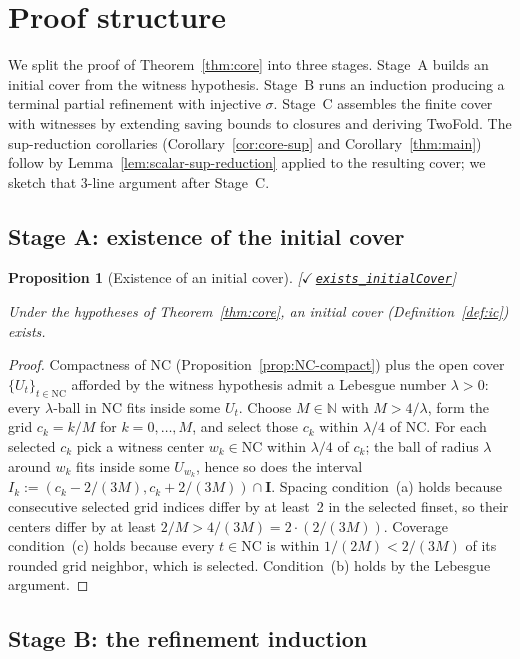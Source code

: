 \documentclass[11pt,reqno]{amsart}
\newtheorem{proposition}[theorem]{Proposition}
\theoremstyle{definition}
\newcommand{\unit}{\mathbf{I}}
\newcommand{\NC}{\mathrm{NC}}
\newcommand{\leanrepo}{https://github.com/MathNetwork/comb_arg/blob/v0.1.0/CombArg}
\newcommand{\leanmargin}[2]{%
  \nopagebreak\hfill{\normalfont\small\color{leangreen}%
    [\ensuremath{\checkmark}\,\href{\leanrepo/#2}{\texttt{#1}}]}\par\nopagebreak
}
\begin{document}
\section{Proof structure}
\label{sec:proof}

We split the proof of Theorem~\ref{thm:core} into three stages.
Stage~A builds an initial cover from the witness hypothesis.
Stage~B runs an induction producing a terminal partial
refinement with injective $\sigma$. Stage~C assembles the finite
cover with witnesses by extending saving bounds to closures and
deriving TwoFold. The sup-reduction corollaries
(Corollary~\ref{cor:core-sup} and Corollary~\ref{thm:main})
follow by Lemma~\ref{lem:scalar-sup-reduction} applied to the
resulting cover; we sketch that 3-line argument after Stage~C.

\subsection{Stage A: existence of the initial cover}

\begin{proposition}[Existence of an initial cover]
\label{prop:exists-ic}
\leanmargin{exists\_initialCover}{Refinement/CoverConstruction.lean}
Under the hypotheses of Theorem~\ref{thm:core}, an initial cover
(Definition~\ref{def:ic}) exists.
\end{proposition}

\begin{proof}
Compactness of $\NC$ (Proposition~\ref{prop:NC-compact}) plus the
open cover $\{U_t\}_{t \in \NC}$ afforded by the witness
hypothesis admit a Lebesgue number $\lambda > 0$: every
$\lambda$-ball in $\NC$ fits inside some $U_t$. Choose
$M \in \mathbb{N}$ with $M > 4/\lambda$, form the grid
$c_k = k/M$ for $k = 0, \ldots, M$, and select those $c_k$ within
$\lambda/4$ of $\NC$. For each selected $c_k$ pick a witness
center $w_k \in \NC$ within $\lambda/4$ of $c_k$; the ball of
radius $\lambda$ around $w_k$ fits inside some $U_{w_k}$, hence
so does the interval
$I_k := (c_k - 2/(3M), c_k + 2/(3M)) \cap \unit$. Spacing
condition~(a) holds because consecutive selected grid indices
differ by at least~2 in the selected finset, so their centers
differ by at least $2/M > 4/(3M) = 2 \cdot (2/(3M))$. Coverage
condition~(c) holds because every $t \in \NC$ is within
$1/(2M) < 2/(3M)$ of its rounded grid neighbor, which is
selected. Condition~(b) holds by the Lebesgue argument.
\end{proof}

\subsection{Stage B: the refinement induction}
\end{document}
